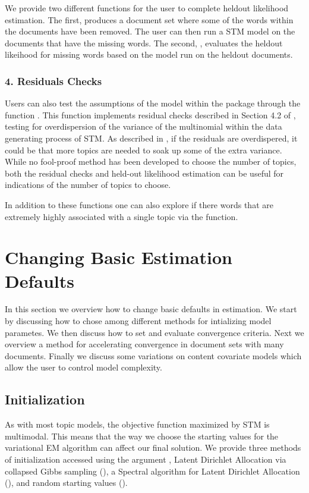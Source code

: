 \documentclass[nojss]{jss}
\begin{document}
We provide two different functions for the user to complete heldout likelihood estimation.  The first,   produces a document set where some of the words within the documents have been removed.  The user can then run a STM model on the documents that have the missing words.  The second, , evaluates the heldout likeihood for missing words based on the model run on the heldout documents.

\subsubsection{4. Residuals Checks}
Users can also test the assumptions of the model within the package through the function .  This function implements residual checks described in Section 4.2 of \citet{taddyestimation}, testing for overdispersion of the variance of the multinomial within the data generating process of STM.  As described in \citet{taddyestimation}, if the residuals are overdispered, it could be that more topics are needed to soak up some of the extra variance.  While no fool-proof method has been developed to choose the number of topics, both the residual checks and held-out likelihood estimation can be useful for indications of the number of topics to choose.

In addition to these functions one can also explore if there words that are extremely highly associated with a single topic via the  function.




\section{Changing Basic Estimation Defaults}
In this section we overview how to change basic defaults in estimation.  We start by discussing how to chose among different methods for intializing model parametes.  We then discuss how to set and evaluate convergence criteria.  Next we overview a method for accelerating convergence in document sets with many documents. Finally we discuss some variations on content covariate models which allow the user to control model complexity.

\subsection{Initialization}
As with most topic models, the objective function maximized by STM is multimodal.  This means that the way we choose the starting values for the variational EM algorithm can affect our final solution.  We provide three methods of initialization accessed using the argument , Latent Dirichlet Allocation via collapsed Gibbs sampling (), a Spectral algorithm for Latent Dirichlet Allocation (), and random starting values ().  
\end{document}
